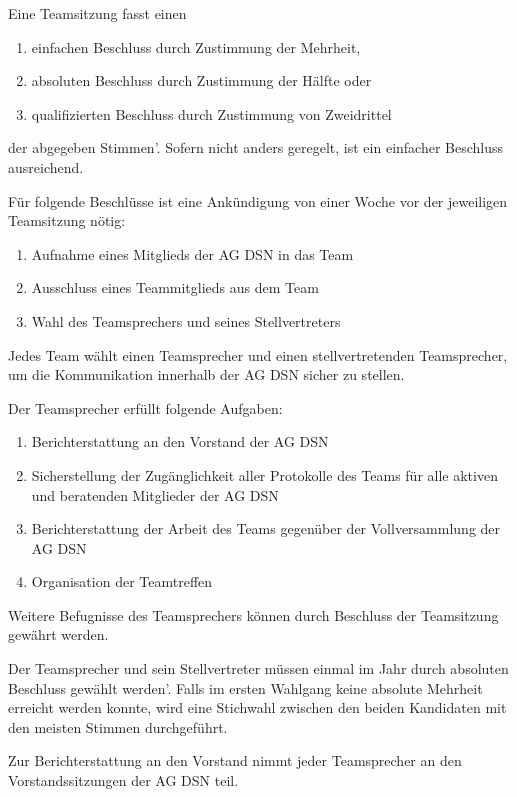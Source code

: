 \documentclass[draft,parskip=half-,DIV=12,mpinclude]{scrartcl}
\begin{document}
\begin{contract}
Eine Teamsitzung fasst einen
\begin{enumerate}
  \item einfachen Beschluss durch Zustimmung der Mehrheit,
  \item absoluten Beschluss durch Zustimmung der Hälfte oder
  \item qualifizierten Beschluss durch Zustimmung von Zweidrittel
\end{enumerate}
der abgegeben Stimmen'. Sofern nicht anders geregelt, ist ein einfacher Beschluss ausreichend.

Für folgende Beschlüsse ist eine Ankündigung von einer Woche vor der jeweiligen Teamsitzung nötig:
\begin{enumerate}
  \item Aufnahme eines Mitglieds der AG DSN in das Team
  \item Ausschluss eines Teammitglieds aus dem Team
  \item Wahl des Teamsprechers und seines Stellvertreters
\end{enumerate}


Jedes Team wählt einen Teamsprecher und einen stellvertretenden Teamsprecher, um die Kommunikation innerhalb der AG DSN sicher zu stellen.

Der Teamsprecher erfüllt folgende Aufgaben:
\begin{enumerate}
  \item Berichterstattung an den Vorstand der AG DSN
  \item Sicherstellung der Zugänglichkeit aller Protokolle des Teams für alle aktiven und beratenden Mitglieder der AG DSN
  \item Berichterstattung der Arbeit des Teams gegenüber der Vollversammlung der AG DSN
  \item Organisation der Teamtreffen
\end{enumerate}

Weitere Befugnisse des Teamsprechers können durch Beschluss der Teamsitzung gewährt werden.

Der Teamsprecher und sein Stellvertreter müssen einmal im Jahr durch absoluten Beschluss gewählt werden'. Falls im ersten Wahlgang keine absolute Mehrheit erreicht werden konnte, wird eine Stichwahl zwischen den beiden Kandidaten mit den meisten Stimmen durchgeführt.

Zur Berichterstattung an den Vorstand nimmt jeder Teamsprecher an den Vorstandssitzungen der AG DSN teil.


\end{contract}
\end{document}
